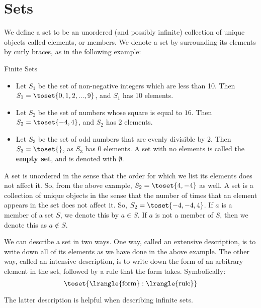 \section{Sets}
We define a set to be an unordered (and possibly infinite) collection of
unique objects called elements, or members. We denote a set by surrounding
its elements by curly braces, as in the following example:

\begin{expl}{Finite Sets}
  \begin{itemize}
    \item Let $S_1$ be the set of non-negative integers which are less than
    10. Then $S_1 = \toset{0, 1, 2, ..., 9}$, and $S_1$ has 10 elements.

    \item Let $S_2$ be the set of numbers whose square is equal to $16$.
    Then $S_2 = \toset{-4, 4}$, and $S_2$ has 2 elements.

    \item Let $S_3$ be the set of odd numbers that are evenly divisible by 2.
    Then $S_3 = \toset{}$, as $S_3$ has 0 elements. A set with no elements is
    called the \textbf{empty set}, and is denoted with $\emptyset$.
  \end{itemize}
\end{expl}

A set is unordered in the sense that the order for which we list its elements
does not affect it. So, from the above example, $S_2 = \toset{4, -4}$ as
well. A set is a collection of unique objects in the sense that the number of
times that an element appears in the set does not affect it. So, $S_2 =
\toset{-4, -4, 4}$. If $a$ is a member of a set $S$, we denote this
by $a \in S$. If $a$ is not a member of $S$, then we denote this as
$a \not \in S$.


We can describe a set in two ways. One way, called an extensive description,
is to write down all of its elements as we have done in the above
example. The other way, called an intensive description, is to write down the
form of an arbitrary element in the set, followed by a rule that the form
takes. Symbolically:
$$ \toset{ \lrangle{\text{form}} : \lrangle{\text{rule}} } $$

The latter description is helpful when describing infinite sets.

